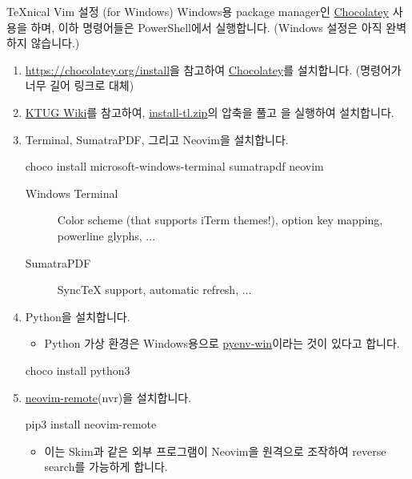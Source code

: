 \documentclass{beamer}
\begin{document}
\begin{frame}{\TeX{}nical Vim 설정 (for Windows)}
  Windows용 package manager인 \href{https://chocolatey.org/}{Chocolatey} 사용을
  하며, 이하 명령어들은 PowerShell에서 실행합니다.
  \alert{(Windows 설정은 아직 완벽하지 않습니다.)}
  \begin{enumerate}
    \item \url{https://chocolatey.org/install}을 참고하여
      \href{https://chocolatey.org/}{Chocolatey}를 설치합니다. (명령어가 너무
      길어 링크로 대체)
    \item \href{http://wiki.ktug.org/wiki/wiki.php}{KTUG Wiki}를 참고하여,
      \href{http://mirror.navercorp.com/CTAN/systems/texlive/tlnet/install-tl.zip}{install-tl.zip}의
      압축을 풀고 을 실행하여 설치합니다.
    \item Terminal, SumatraPDF, 그리고 Neovim을 설치합니다.
      \begin{shellcode}
        choco install microsoft-windows-terminal sumatrapdf neovim 
      \end{shellcode}
      \begin{description}
        \item[Windows Terminal] Color scheme (that supports iTerm themes!),
          \alert{option key mapping}, powerline glyphs, ...
        \item[SumatraPDF] Sync\TeX{} support, automatic refresh, ...
      \end{description}

    \framebreak
    \item Python을 설치합니다.
      \begin{itemize}
        \item Python 가상 환경은 Windows용으로
          \href{https://github.com/pyenv-win/pyenv-win}{pyenv-win}이라는 것이
          있다고 합니다.
      \end{itemize}
      \begin{shellcode}
        choco install python3
      \end{shellcode}

    \item \href{https://github.com/mhinz/neovim-remote}{neovim-remote}(nvr)을 설치합니다.
      \begin{shellcode}
        pip3 install neovim-remote
      \end{shellcode}
      \begin{itemize}
        \item 이는 Skim과 같은 외부 프로그램이 Neovim을 원격으로 조작하여
          reverse search를 가능하게 합니다.
      \end{itemize}


\end{enumerate}
\end{frame}
\end{document}
